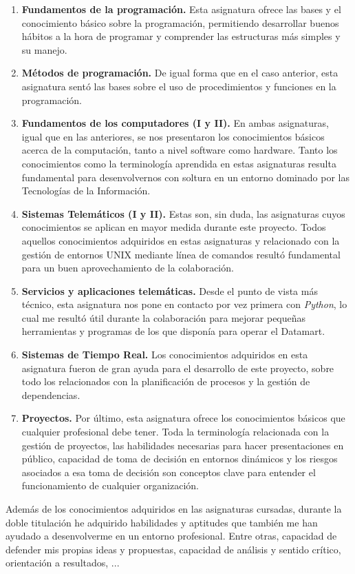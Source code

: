\documentclass[a4paper, 12pt]{book}
\begin{document}
\begin{enumerate}
	\item \textbf{Fundamentos de la programación.} Esta asignatura ofrece las bases y el conocimiento básico sobre la programación, permitiendo desarrollar buenos hábitos a la hora de programar y comprender las estructuras más simples y su manejo.
	\item \textbf{Métodos de programación.} De igual forma que en el caso anterior, esta asignatura sentó las bases sobre el uso de procedimientos y funciones en la programación.
	\item \textbf{Fundamentos de los computadores (I y II).} En ambas asignaturas, igual que en las anteriores, se nos presentaron los conocimientos básicos acerca de la computación, tanto a nivel software como hardware. Tanto los conocimientos como la terminología aprendida en estas asignaturas resulta fundamental para desenvolvernos con soltura en un entorno dominado por las Tecnologías de la Información.
	\item \textbf{Sistemas Telemáticos (I y II).} Estas son, sin duda, las asignaturas cuyos conocimientos se aplican en mayor medida durante este proyecto. Todos aquellos conocimientos adquiridos en estas asignaturas y relacionado con la gestión de entornos UNIX mediante línea de comandos resultó fundamental para un buen aprovechamiento de la colaboración.
	\item \textbf{Servicios y aplicaciones telemáticas.} Desde el punto de vista más técnico, esta asignatura nos pone en contacto por vez primera con \textit{Python}, lo cual me resultó útil durante la colaboración para mejorar pequeñas herramientas y programas de los que disponía para operar el Datamart.
	\item \textbf{Sistemas de Tiempo Real.} Los conocimientos adquiridos en esta asignatura fueron de gran ayuda para el desarrollo de este proyecto, sobre todo los relacionados con la planificación de procesos y la gestión de dependencias.
	\item \textbf{Proyectos.} Por último, esta asignatura ofrece los conocimientos básicos que cualquier profesional debe tener. Toda la terminología relacionada con la gestión de proyectos, las habilidades necesarias para hacer presentaciones en público, capacidad de toma de decisión en entornos dinámicos y los riesgos asociados a esa toma de decisión son conceptos clave para entender el funcionamiento de cualquier organización.
\end{enumerate}

Además de los conocimientos adquiridos en las asignaturas cursadas, durante la doble titulación he adquirido habilidades y aptitudes que también me han ayudado a desenvolverme en un entorno profesional. Entre otras, capacidad de defender mis propias ideas y propuestas, capacidad de análisis y sentido crítico, orientación a resultados, ...
\end{document}
